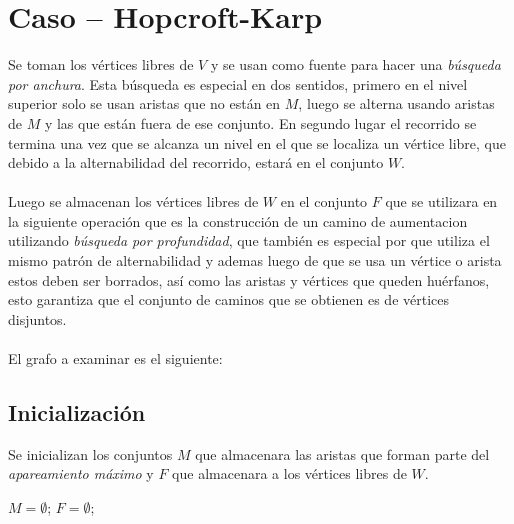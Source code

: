 \documentclass[12pt,a4paper]{article}
\begin{document}
\section{Caso -- Hopcroft-Karp} \noindent
Se toman los vértices libres de $V$ y se usan como fuente para hacer una \textit{búsqueda por anchura}. Esta búsqueda es especial en dos sentidos, primero en el nivel superior solo se usan aristas que no están en $M$, luego se alterna usando aristas de $M$ y las que están fuera de ese conjunto. En segundo lugar el recorrido se termina una vez que se alcanza un nivel en el que se localiza un vértice libre, que debido a la alternabilidad del recorrido, estará en el conjunto $W$.\\\\
Luego se almacenan los vértices libres de $W$ en el conjunto $F$ que se utilizara en la siguiente operación que es la construcción de un camino de aumentacion utilizando \textit{búsqueda por profundidad}, que también es especial por que utiliza el mismo patrón de alternabilidad y ademas luego de que se usa un vértice o arista estos deben ser borrados, así como las aristas y vértices que queden huérfanos, esto garantiza que el conjunto de caminos que se obtienen es de vértices disjuntos.\\\\
El grafo a examinar es el siguiente:
\begin{center}
\end{center}

\subsection{Inicialización}
Se inicializan los conjuntos $M$ que almacenara las aristas que forman parte del \textit{apareamiento máximo} y $F$ que almacenara a los vértices libres de $W$.
\begin{center}
$M=\emptyset$; $F=\emptyset$;
\end{center}
\end{document}
